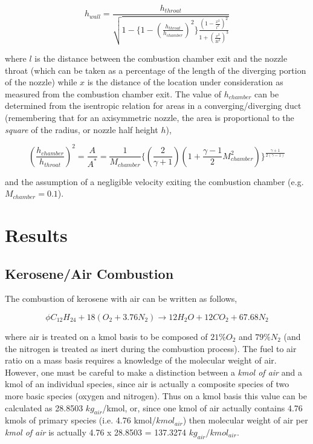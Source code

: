 \begin{equation}
	h_{wall} = \frac{h_{throat}}{ \sqrt{1 - \Big\{1- (\frac{h_{throat}}{h_{chamber}})^2\Big\}
	\frac{(1-\frac{x^2}{l^2})^2}{1+(\frac{x^2}{3l^2})^3} }}
\label{eqn:subsonic}
\end{equation}
	
	where $l$ is the distance between the combustion chamber exit and the nozzle throat (which can be 
taken as a percentage of the length of the diverging portion of the nozzle) while
$x$ is the distance of the location under consideration as measured from the combustion chamber exit.  
The value of $h_{chamber}$ can be determined from the isentropic relation for areas in a 
converging/diverging duct (remembering that for an axisymmetric nozzle, the area is proportional to the
\emph{square} of the radius, or nozzle half height $h$),

\begin{equation}
	(\frac{h_{chamber}}{h_{throat}})^2 = \frac{A}{A^*} = \frac{1}{M_{chamber}}\Big\{(\frac{2}{\gamma +1})
	(1 + \frac{\gamma-1}{2}M_{chamber}^2)\Big\}^\frac{\gamma +1}{2(\gamma -1)} 
\label{eqn:area}
\end{equation}

	and the assumption of a negligible velocity exiting the combustion chamber (e.g. 
$M_{chamber} = 0.1$).

\section{Results}

\subsection{Kerosene/Air Combustion}

	The combustion of kerosene with air can be written as follows,

\begin{equation}
	\phi C_{12}H_{24} + 18 (O_2 + 3.76 N_2) \longrightarrow 12 H_2O + 12 CO_2 + 67.68 N_2
\label{eqn:kerocombair}
\end{equation}

	where air is treated on a kmol basis to be composed of $21\% O_2$ and $79\% N_2$ (and 
the nitrogen is treated as inert during the combustion process).  The 
fuel to air ratio on a mass basis requires a knowledge of the molecular weight of air.  However, one must
be careful to make a distinction between a \emph{kmol of air} and a kmol of an individual species, since air
is actually a composite species of two more basic species (oxygen and nitrogen).  Thus on a kmol basis this
value can be calculated as 28.8503 $kg_{air}$/kmol, or, since one kmol of air actually contains 
4.76 kmols of primary species (i.e. 4.76 kmol/$kmol_{air}$) then molecular weight of air per 
\emph{kmol of air} is actually 4.76 x 28.8503 = 137.3274 $kg_{air}/kmol_{air}$.

